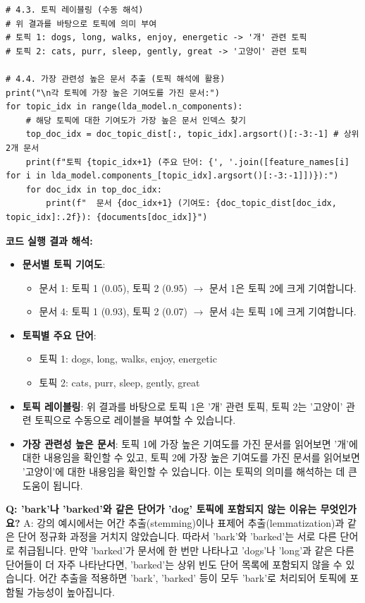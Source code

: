 \documentclass[11pt,a4paper]{article}
\theoremstyle{definition}
\begin{document}
\begin{lstlisting}[caption={Python을 이용한 LDA 구현 예시}, label={lst:python_lda}]
# 4.3. 토픽 레이블링 (수동 해석)
# 위 결과를 바탕으로 토픽에 의미 부여
# 토픽 1: dogs, long, walks, enjoy, energetic -> '개' 관련 토픽
# 토픽 2: cats, purr, sleep, gently, great -> '고양이' 관련 토픽

# 4.4. 가장 관련성 높은 문서 추출 (토픽 해석에 활용)
print("\n각 토픽에 가장 높은 기여도를 가진 문서:")
for topic_idx in range(lda_model.n_components):
    # 해당 토픽에 대한 기여도가 가장 높은 문서 인덱스 찾기
    top_doc_idx = doc_topic_dist[:, topic_idx].argsort()[:-3:-1] # 상위 2개 문서
    print(f"토픽 {topic_idx+1} (주요 단어: {', '.join([feature_names[i] for i in lda_model.components_[topic_idx].argsort()[:-3:-1]])}):")
    for doc_idx in top_doc_idx:
        print(f"  문서 {doc_idx+1} (기여도: {doc_topic_dist[doc_idx, topic_idx]:.2f}): {documents[doc_idx]}")
\end{lstlisting}

\begin{examplebox}
\textbf{코드 실행 결과 해석:}
\begin{itemize}
    \item \textbf{문서별 토픽 기여도}:
    \begin{itemize}
        \item 문서 1: 토픽 1 (0.05), 토픽 2 (0.95) $\rightarrow$ 문서 1은 토픽 2에 크게 기여합니다.
        \item 문서 4: 토픽 1 (0.93), 토픽 2 (0.07) $\rightarrow$ 문서 4는 토픽 1에 크게 기여합니다.
    \end{itemize}
    \item \textbf{토픽별 주요 단어}:
    \begin{itemize}
        \item 토픽 1: dogs, long, walks, enjoy, energetic
        \item 토픽 2: cats, purr, sleep, gently, great
    \end{itemize}
    \item \textbf{토픽 레이블링}: 위 결과를 바탕으로 토픽 1은 '개' 관련 토픽, 토픽 2는 '고양이' 관련 토픽으로 수동으로 레이블을 부여할 수 있습니다.
    \item \textbf{가장 관련성 높은 문서}: 토픽 1에 가장 높은 기여도를 가진 문서를 읽어보면 '개'에 대한 내용임을 확인할 수 있고, 토픽 2에 가장 높은 기여도를 가진 문서를 읽어보면 '고양이'에 대한 내용임을 확인할 수 있습니다. 이는 토픽의 의미를 해석하는 데 큰 도움이 됩니다.
\end{itemize}
\end{examplebox}

\begin{faqbox}
\textbf{Q: 'bark'나 'barked'와 같은 단어가 'dog' 토픽에 포함되지 않는 이유는 무엇인가요?}
A: 강의 예시에서는 어간 추출(stemming)이나 표제어 추출(lemmatization)과 같은 단어 정규화 과정을 거치지 않았습니다. 따라서 'bark'와 'barked'는 서로 다른 단어로 취급됩니다. 만약 'barked'가 문서에 한 번만 나타나고 'dogs'나 'long'과 같은 다른 단어들이 더 자주 나타난다면, 'barked'는 상위 빈도 단어 목록에 포함되지 않을 수 있습니다. 어간 추출을 적용하면 'bark', 'barked' 등이 모두 'bark'로 처리되어 토픽에 포함될 가능성이 높아집니다.
\end{faqbox}
\end{document}
